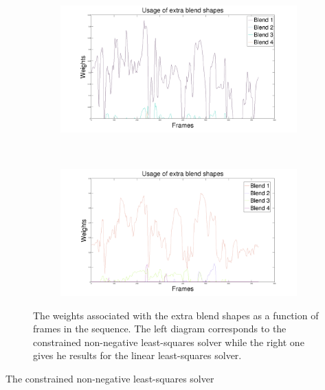 \documentclass[11pt]{report}
\begin{document}
\begin{figure}[htbp!]
        \centering
        \begin{subfigure}[b]{0.47\textwidth}
                \includegraphics[trim = 10mm 0mm 10mm 0mm,clip,width=\textwidth]{img/weights/3D/Extrafaces/w2_72_usage.png}
        \end{subfigure}
        ~ %
        \begin{subfigure}[b]{0.47\textwidth}
                \includegraphics[trim = 10mm 0mm 10mm 0mm,clip,width=\textwidth]{img/weights/3D/Extrafaces/w3_72_usage.png}
        \end{subfigure}
        \caption{The weights associated with the extra blend shapes as a function of frames in the sequence. The left diagram corresponds to the constrained non-negative least-squares solver while the right one gives he results for the linear least-squares solver.}\label{fig:usage}
\end{figure}

The constrained non-negative least-squares solver 
\end{document}
